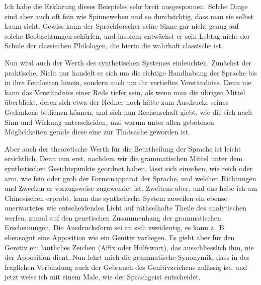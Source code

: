 \largerpage[1]Ich habe die Erklärung dieses Beispieles sehr breit ausgesponnen. Solche Dinge sind aber auch oft fein wie Spinneweben und so durchsichtig, dass man sie selbst kaum sieht. Gewiss kann der Sprachforscher seine Sinne gar nicht genug auf solche Beobachtungen schärfen, und insofern entwächst er sein Lebtag nicht der Schule der classischen Philologen, die hierin die wahrhaft classische ist.

\label{fp.100}

Nun wird auch der Werth des synthetischen Systemes einleuchten. Zunächst der praktische. Nicht nur handelt es sich um die richtige Handhabung der Sprache bis in ihre  Feinheiten hinein, sondern auch um ihr vertieftes Verständniss. Denn nie kann das Verständniss einer Rede tiefer sein, als wenn man die übrigen Mittel überblickt, deren sich etwa der Redner noch hätte zum Ausdrucke seines Gedankens bedienen können, und sich nun Rechenschaft giebt, wie die sich nach Sinn und Wirkung unterscheiden, und warum unter allen gebotenen Möglichkeiten gerade diese eine zur Thatsache geworden ist.

\label{sp.97}

Aber auch der theoretische Werth für die Beurtheilung der Sprache ist leicht ersichtlich. Denn nun erst, nachdem wir die grammatischen Mittel unter dem synthetischen Gesichtspunkte geordnet haben, lässt sich einsehen, wie reich oder arm, wie fein oder grob der Formenapparat der Sprache, und welchen Richtungen und Zwecken er vorzugsweise zugewendet ist. Zweitens aber, und das habe ich am Chinesischen erprobt, kann das synthetische System zuweilen ein ebenso unerwartetes wie entscheidendes Licht auf räthselhafte Theile des analytischen werfen, zumal auf den genetischen Zusammenhang der grammatischen Erscheinungen. Die Ausdrucksform sei an sich zweideutig, es kann z.~B. ebensogut eine Apposition wie ein Genitiv vorliegen. Es giebt aber für den Genitiv ein lautliches Zeichen (Affix oder Hülfswort), das ausschliesslich ihm, nie der Apposition dient. Nun lehrt mich die grammatische Synonymik, dass in der fraglichen Verbindung auch der Gebrauch des Genitivzeichens zulässig ist, und jetzt weiss ich mit einem Male, wie der Sprachgeist entscheidet.

